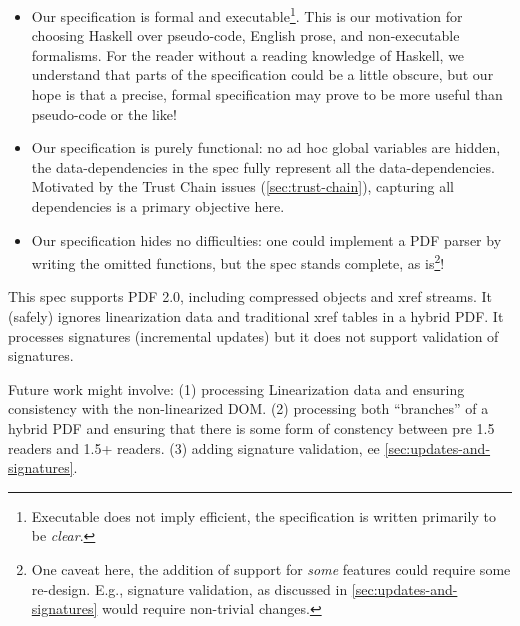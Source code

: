 \begin{itemize}
\item Our specification is formal and executable\footnote{
  Executable does not imply efficient, the specification is written
  primarily to be \emph{clear}.}.
  This is our motivation for choosing Haskell over pseudo-code, English prose,
  and non-executable formalisms.  For the reader without a reading knowledge of
  Haskell, we understand that parts of the specification could be a little
  obscure, but our hope is that a precise, formal specification may prove to be
  more useful than pseudo-code or the like!
  
\item Our specification is purely functional: no ad hoc global variables are
  hidden, the data-dependencies in the spec fully represent all the
  data-dependencies.  Motivated by the Trust Chain issues
  (\cref{sec:trust-chain}), capturing all dependencies is a primary objective
  here.
  
\item Our specification hides no difficulties: one could implement a PDF parser
  by writing the omitted functions, but the spec stands complete, as
  is\footnote{One caveat here, the addition of support for \emph{some} features
  could require some re-design.  E.g., signature validation, as discussed in
  \cref{sec:updates-and-signatures} would require non-trivial changes.
  }!
\end{itemize}


This spec supports PDF 2.0, including compressed objects and xref streams.
%
It (safely) ignores linearization data and traditional xref tables in a hybrid
PDF.  It processes signatures (incremental updates) but it does not support
validation of signatures.


Future work might involve:
(1) processing Linearization data and ensuring consistency with the
non-linearized DOM.
(2) processing both ``branches'' of a hybrid PDF and ensuring that there
is some form of constency between pre 1.5 readers and 1.5+ readers.
(3) adding signature validation, ee \cref{sec:updates-and-signatures}.

